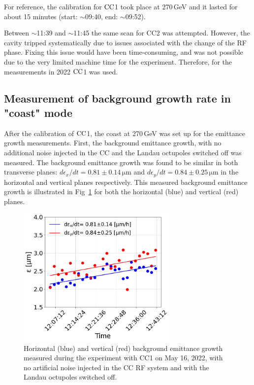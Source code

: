 For reference, the calibration for ${\mathrm{CC}}$1 took place at 270\,GeV and it lasted for about 15 minutes (start: $\sim$09:40, end: $\sim$09:52).

Between $\sim$11:39 and $\sim$11:45 the same scan for CC2 was attempted. However, the cavity tripped systematically due to issues associated with the change of the RF phase. Fixing this issue would have been time-consuming, and was not possible due to the very limited machine time for the experiment. Therefore, for the measurements in 2022 ${\mathrm{CC}}$1 was used.


\subsection{Measurement of background growth rate in "coast" mode}\label{subsec:measured_background_growth_cc_md_2022}
After the calibration of ${\mathrm{CC}}$1, the coast at 270\,GeV was set up for the emittance growth measurements. First, the background emittance growth, with no additional noise injected in the CC and the Landau octupoles switched off was measured. The background emittance growth was found to be similar in both transverse planes: $d\epsilon_x /dt=0.81 \pm 0.14$\,$\mathrm{\mu m}$ and $d\epsilon_y /dt=0.84 \pm0.25$\,$\mathrm{\mu m}$ in the horizontal and vertical planes respectively. This measured background emittance growth is illustrated in Fig~\ref{fig:cc_md_2022_background_growth_in_scan} for both the horizontal (blue) and vertical (red) planes.

\begin{figure}[!h] %
   \centering         
   \includegraphics[width=0.7\textwidth]{images/Ch8/cc_md_2022_background_in_scan.png}
       \caption{Horizontal (blue) and vertical (red) background emittance growth measured during the experiment with CC1 on May 16, 2022, with no artificial noise injected in the CC RF system and with the Landau octupoles switched off.}
       \label{fig:cc_md_2022_background_growth_in_scan}
\end{figure}

